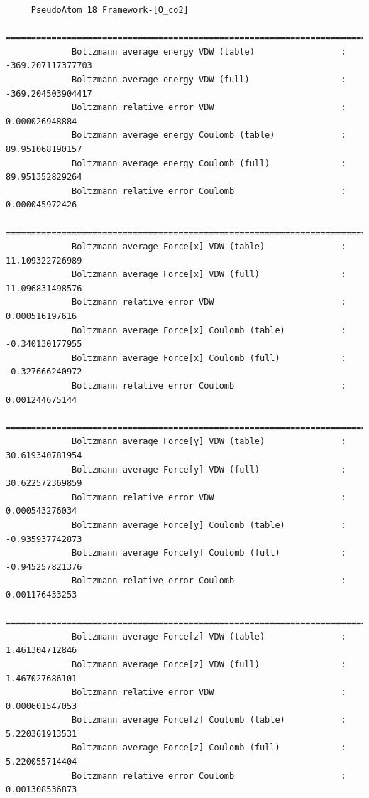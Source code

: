 \begin{tiny}
\begin{verbatim}
     PseudoAtom 18 Framework-[O_co2]
     =========================================================================================
             Boltzmann average energy VDW (table)                 :  -369.207117377703
             Boltzmann average energy VDW (full)                  :  -369.204503904417
             Boltzmann relative error VDW                         :     0.000026948884
             Boltzmann average energy Coulomb (table)             :    89.951068190157
             Boltzmann average energy Coulomb (full)              :    89.951352829264
             Boltzmann relative error Coulomb                     :     0.000045972426
     =========================================================================================
             Boltzmann average Force[x] VDW (table)               :    11.109322726989
             Boltzmann average Force[x] VDW (full)                :    11.096831498576
             Boltzmann relative error VDW                         :     0.000516197616
             Boltzmann average Force[x] Coulomb (table)           :    -0.340130177955
             Boltzmann average Force[x] Coulomb (full)            :    -0.327666240972
             Boltzmann relative error Coulomb                     :     0.001244675144
     =========================================================================================
             Boltzmann average Force[y] VDW (table)               :    30.619340781954
             Boltzmann average Force[y] VDW (full)                :    30.622572369859
             Boltzmann relative error VDW                         :     0.000543276034
             Boltzmann average Force[y] Coulomb (table)           :    -0.935937742873
             Boltzmann average Force[y] Coulomb (full)            :    -0.945257821376
             Boltzmann relative error Coulomb                     :     0.001176433253
     =========================================================================================
             Boltzmann average Force[z] VDW (table)               :     1.461304712846
             Boltzmann average Force[z] VDW (full)                :     1.467027686101
             Boltzmann relative error VDW                         :     0.000601547053
             Boltzmann average Force[z] Coulomb (table)           :     5.220361913531
             Boltzmann average Force[z] Coulomb (full)            :     5.220055714404
             Boltzmann relative error Coulomb                     :     0.001308536873
\end{verbatim}
\end{tiny}

